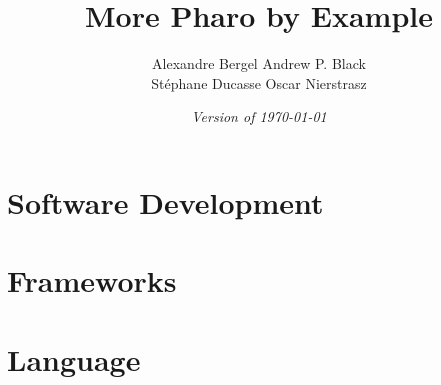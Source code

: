 \documentclass[a4paper,10pt,twoside]{book}
\begin{document}
\frontmatter
\setcounter{page}{1}
\pagestyle{headings}
\author{
	Alexandre Bergel\quad
	Andrew P. Black\\[1ex]
	St\'ephane Ducasse\quad
	Oscar Nierstrasz\quad}
\title{\Huge\bf More Pharo by Example\\[1ex]}
\isodate
\date{\emph{Version of \today}}
\maketitle
\tableofcontents
\sloppy %
\mainmatter

\part{Software Development}

% 
% 
% 

\part{Frameworks}

% 



\part{Language}

% 






\printindex
\end{document}

